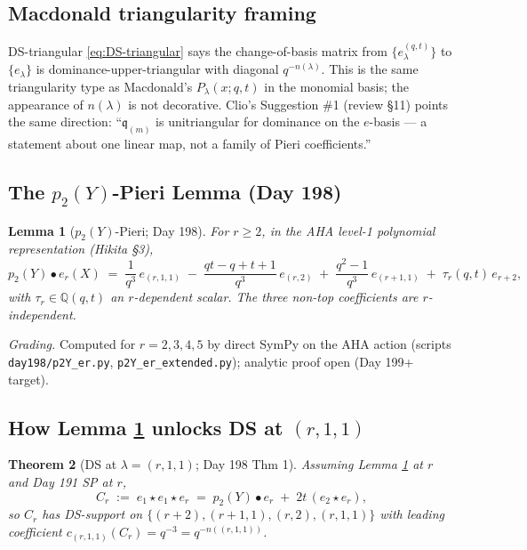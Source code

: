 \documentclass[11pt]{article}
\newtheorem{theorem}{Theorem}
\newtheorem{lemma}[theorem]{Lemma}
\theoremstyle{definition}
\newcommand{\bul}{\bullet}
\newcommand{\qm}{\mathfrak q}
\begin{document}
\subsection*{Macdonald triangularity framing}
DS-triangular \eqref{eq:DS-triangular} says the change-of-basis matrix
from $\{e_\lambda^{(q,t)}\}$ to $\{e_\lambda\}$ is dominance-upper-triangular
with diagonal $q^{-n(\lambda)}$. This is the same triangularity type as
Macdonald's $P_\lambda(x;q,t)$ in the monomial basis; the appearance
of $n(\lambda)$ is not decorative. Clio's Suggestion \#1 (review
\S11) points the same direction: ``$\qm_{(m)}$ is unitriangular for
dominance on the $e$-basis --- a statement about one linear map, not a
family of Pieri coefficients.''

\subsection*{The $p_2(Y)$-Pieri Lemma (Day 198)}
\begin{lemma}[$p_2(Y)$-Pieri; Day 198]\label{lem:p2Y}
For $r\ge 2$, in the AHA level-1 polynomial representation
(Hikita \S3),
\begin{equation}\label{eq:p2Y-pieri}
  p_2(Y)\bul e_r(X) \;=\; \frac{1}{q^3}\,e_{(r,1,1)}
   \;-\; \frac{qt-q+t+1}{q^3}\,e_{(r,2)}
   \;+\; \frac{q^2-1}{q^3}\,e_{(r+1,1)}
   \;+\; \tau_r(q,t)\, e_{r+2},
\end{equation}
with $\tau_r\in\mathbb Q(q,t)$ an $r$-dependent scalar. The three
non-top coefficients are $r$-independent.
\end{lemma}
\emph{Grading.} Computed for $r=2,3,4,5$ by direct SymPy on the AHA
action (scripts \verb|day198/p2Y_er.py|, \verb|p2Y_er_extended.py|);
analytic proof open (Day 199+ target).

\subsection*{How Lemma \ref{lem:p2Y} unlocks DS at $(r,1,1)$}
\begin{theorem}[DS at $\lambda=(r,1,1)$; Day 198 Thm 1]\label{thm:DS-r11}
Assuming Lemma \ref{lem:p2Y} at $r$ and Day 191 SP at $r$,
\begin{equation}\label{eq:C_r-decomp}
  C_r \;:=\; e_1\star e_1\star e_r
     \;=\; p_2(Y)\bul e_r \;+\; 2t\,(e_2\star e_r),
\end{equation}
so $C_r$ has DS-support on $\{(r+2),(r+1,1),(r,2),(r,1,1)\}$ with
leading coefficient $c_{(r,1,1)}(C_r) = q^{-3} = q^{-n((r,1,1))}$.
\end{theorem}
\end{document}
